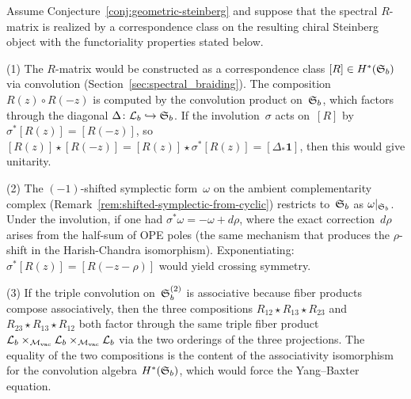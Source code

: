 \begin{evidence}
\label{evid:R-matrix-steinberg}
Assume Conjecture~\ref{conj:geometric-steinberg} and suppose that the
spectral $R$-matrix is realized by a correspondence class on the resulting chiral
Steinberg object with the functoriality properties stated below.

(1) The $R$-matrix would be constructed as a correspondence class
$[R] \in H^*(\mathfrak{S}_b)$ via convolution
(Section~\ref{sec:spectral_braiding}). The composition
$R(z) \circ R(-z)$ is computed by the convolution product
on~$\mathfrak{S}_b$, which factors through the diagonal
$\Delta \colon \mathcal{L}_b \hookrightarrow \mathfrak{S}_b$.
If the involution~$\sigma$ acts on~$[R]$ by
$\sigma^*[R(z)] = [R(-z)]$, so
$[R(z)] \star [R(-z)] = [R(z)] \star \sigma^*[R(z)]
= [\Delta_*\mathbf{1}]$, then this would give unitarity.

(2) The $(-1)$-shifted symplectic form~$\omega$ on the ambient
complementarity complex
(Remark~\ref{rem:shifted-symplectic-from-cyclic}) restricts
to~$\mathfrak{S}_b$ as $\omega|_{\mathfrak{S}_b}$. Under the
involution, if one had $\sigma^*\omega = -\omega + d\rho$, where the
exact correction~$d\rho$ arises from the half-sum of OPE
poles (the same mechanism that produces the $\rho$-shift in
the Harish-Chandra isomorphism). Exponentiating:
$\sigma^*[R(z)] = [R(-z-\rho)]$ would yield crossing symmetry.

(3) If the triple convolution on~$\mathfrak{S}_b^{(2)}$ is
associative because fiber products compose associatively, then
the three compositions $R_{12} \star R_{13} \star R_{23}$ and
$R_{23} \star R_{13} \star R_{12}$ both factor through the
same triple fiber product
$\mathcal{L}_b \times_{{\mathcal{M}_{\mathrm{vac}}}} \mathcal{L}_b
\times_{{\mathcal{M}_{\mathrm{vac}}}} \mathcal{L}_b$
via the two orderings of the three projections. The equality
of the two compositions is the content of the associativity
isomorphism for the convolution algebra
$H^*(\mathfrak{S}_b)$, which would force the Yang--Baxter equation.
\end{evidence}

